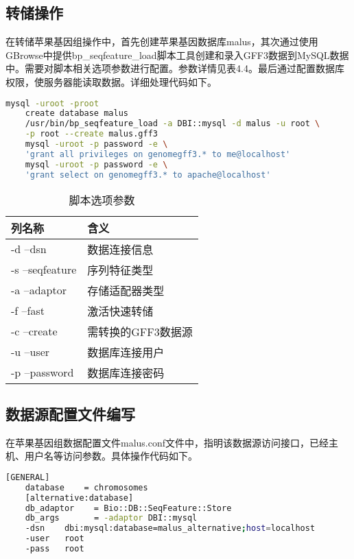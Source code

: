 	\subsection{转储操作}
	在转储苹果基因组操作中，首先创建苹果基因数据库malus，其次通过使用GBrowse中提供bp\_seqfeature\_load脚本工具创建和录入GFF3数据到MySQL数据中。需要对脚本相关选项参数进行配置。参数详情见表4.4。最后通过配置数据库权限，使服务器能读取数据。详细处理代码如下。\\
	\begin{lstlisting}[language=bash]
	mysql -uroot -proot
	create database malus
	/usr/bin/bp_seqfeature_load -a DBI::mysql -d malus -u root \
	-p root --create malus.gff3
	mysql -uroot -p password -e \
	'grant all privileges on genomegff3.* to me@localhost'
	mysql -uroot -p password -e \
	'grant select on genomegff3.* to apache@localhost'
	\end{lstlisting}
	\begin{table}[!htbp]
		\centering
		\begin{tabular}{ll}	
			\toprule
			列名称& 含义\\
			\midrule
			-d --dsn&数据连接信息\\
			-s --seqfeature&序列特征类型\\
			-a --adaptor&存储适配器类型\\
			-f --fast&激活快速转储 \\
			-c --create&需转换的GFF3数据源 \\
			-u --user&数据库连接用户 \\
			-p --password&数据库连接密码 \\
			\bottomrule
		\end{tabular}
		\caption{脚本选项参数}
	\end{table}
	\subsection{数据源配置文件编写}
	在苹果基因组数据配置文件malus.conf文件中，指明该数据源访问接口，已经主机、用户名等访问参数。具体操作代码如下。
	\begin{lstlisting}[language=bash]
	[GENERAL]
	database	= chromosomes
	[alternative:database]
	db_adaptor    = Bio::DB::SeqFeature::Store
	db_args       = -adaptor DBI::mysql
	-dsn    dbi:mysql:database=malus_alternative;host=localhost
	-user   root
	-pass   root
	\end{lstlisting}